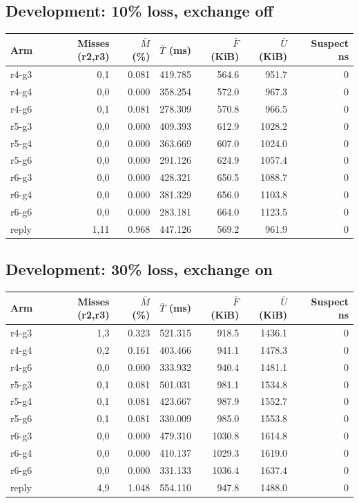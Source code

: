 \subsection*{Development: 10\% loss, exchange off}
\begin{center}\small
\begin{tabular}{lrrrrrr}
Arm & Misses (r2,r3) & $\bar M$ (\%) & $\bar T$ (ms) & $\bar F$ (KiB) & $\bar U$ (KiB) & Suspect ns \\ \hline
r4-g3 & 0,1 & 0.081 & 419.785 & 564.6 & 951.7 & 0 \\
r4-g4 & 0,0 & 0.000 & 358.254 & 572.0 & 967.3 & 0 \\
r4-g6 & 0,1 & 0.081 & 278.309 & 570.8 & 966.5 & 0 \\
r5-g3 & 0,0 & 0.000 & 409.393 & 612.9 & 1028.2 & 0 \\
r5-g4 & 0,0 & 0.000 & 363.669 & 607.0 & 1024.0 & 0 \\
r5-g6 & 0,0 & 0.000 & 291.126 & 624.9 & 1057.4 & 0 \\
r6-g3 & 0,0 & 0.000 & 428.321 & 650.5 & 1088.7 & 0 \\
r6-g4 & 0,0 & 0.000 & 381.329 & 656.0 & 1103.8 & 0 \\
r6-g6 & 0,0 & 0.000 & 283.181 & 664.0 & 1123.5 & 0 \\
reply & 1,11 & 0.968 & 447.126 & 569.2 & 961.9 & 0 \\
\end{tabular}\end{center}
\Needspace{190pt}
\subsection*{Development: 30\% loss, exchange on}
\begin{center}\small
\begin{tabular}{lrrrrrr}
Arm & Misses (r2,r3) & $\bar M$ (\%) & $\bar T$ (ms) & $\bar F$ (KiB) & $\bar U$ (KiB) & Suspect ns \\ \hline
r4-g3 & 1,3 & 0.323 & 521.315 & 918.5 & 1436.1 & 0 \\
r4-g4 & 0,2 & 0.161 & 403.466 & 941.1 & 1478.3 & 0 \\
r4-g6 & 0,0 & 0.000 & 333.932 & 940.4 & 1481.1 & 0 \\
r5-g3 & 0,1 & 0.081 & 501.031 & 981.1 & 1534.8 & 0 \\
r5-g4 & 0,1 & 0.081 & 423.667 & 987.9 & 1552.7 & 0 \\
r5-g6 & 0,1 & 0.081 & 330.009 & 985.0 & 1553.8 & 0 \\
r6-g3 & 0,0 & 0.000 & 479.310 & 1030.8 & 1614.8 & 0 \\
r6-g4 & 0,0 & 0.000 & 410.137 & 1029.3 & 1619.0 & 0 \\
r6-g6 & 0,0 & 0.000 & 331.133 & 1036.4 & 1637.4 & 0 \\
reply & 4,9 & 1.048 & 554.110 & 947.8 & 1488.0 & 0 \\
\end{tabular}\end{center}
\Needspace{190pt}
